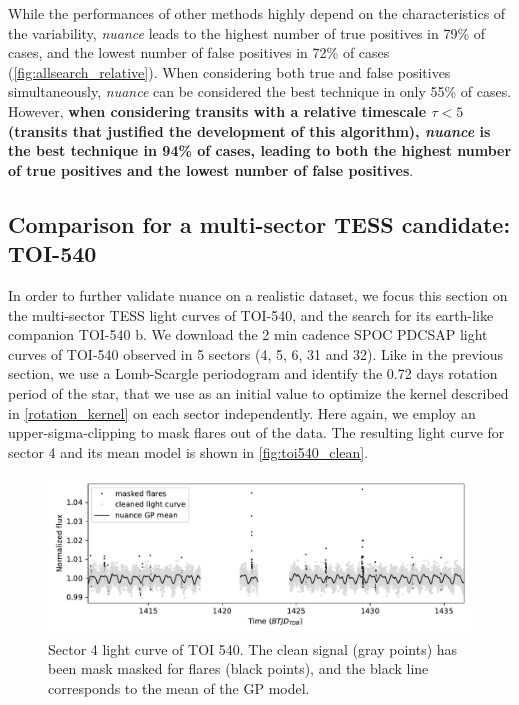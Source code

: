 \documentclass[modern]{aastex631}
\newcommand{\nuancemethod}{\textit{nuance}}
\newcommand{\nuance}{\nuancemethod{}}
\begin{document}
While the performances of other methods highly depend on the characteristics of the variability, \nuance{} leads to the highest number of true positives in 79\% of cases, and the lowest number of false positives in 72\% of cases (\autoref{fig:allsearch_relative}). When considering both true and false positives simultaneously, \nuance{} can be considered the best technique in only 55\% of cases. However, \textbf{when considering transits with a relative timescale $\tau < 5$ (transits that justified the development of this algorithm), \nuancemethod{} is the best technique in 94\% of cases, leading to both the highest number of true positives and the lowest number of false positives}.

\subsection{Comparison for a multi-sector TESS candidate: TOI-540}\label{toi540}

In order to further validate nuance on a realistic dataset, we focus this section on the multi-sector TESS light curves of TOI-540, and the search for its earth-like companion TOI-540 b. We download the 2 min cadence SPOC PDCSAP light curves of TOI-540 observed in 5 sectors (4, 5, 6, 31 and 32). Like in the previous section, we use a Lomb-Scargle periodogram and identify the 0.72 days rotation period of the star, that we use as an initial value to optimize the kernel described in \autoref{rotation_kernel} on each sector independently. Here again, we employ an upper-sigma-clipping to mask flares out of the data. The resulting light curve for sector 4 and its mean model is shown in \autoref{fig:toi540_clean}.
\begin{figure}[H]
    \begin{centering}
        \includegraphics[width=\linewidth]{../workflows/comparison_toi/figures/TOI 540/4.pdf}
        \caption{Sector 4 light curve of TOI 540. The clean signal (gray points) has been mask masked for flares (black points), and the black line corresponds to the mean of the GP model.}
        \label{fig:toi540_clean}
    \end{centering}
\end{figure}
\end{document}
